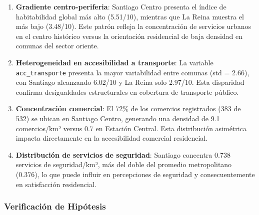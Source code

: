 \begin{enumerate}
    \item \textbf{Gradiente centro-periferia}: Santiago Centro presenta el índice de habitabilidad global más alto (5.51/10), mientras que La Reina muestra el más bajo (3.48/10). Este patrón refleja la concentración de servicios urbanos en el centro histórico versus la orientación residencial de baja densidad en comunas del sector oriente.
    
    \item \textbf{Heterogeneidad en accesibilidad a transporte}: La variable \texttt{acc\_transporte} presenta la mayor variabilidad entre comunas (std = 2.66), con Santiago alcanzando 6.02/10 y La Reina solo 2.97/10. Esta disparidad confirma desigualdades estructurales en cobertura de transporte público.
    
    \item \textbf{Concentración comercial}: El 72\% de los comercios registrados (383 de 532) se ubican en Santiago Centro, generando una densidad de 9.1 comercios/km² versus 0.7 en Estación Central. Esta distribución asimétrica impacta directamente en la accesibilidad comercial residencial.
    
    \item \textbf{Distribución de servicios de seguridad}: Santiago concentra 0.738 servicios de seguridad/km², más del doble del promedio metropolitano (0.376), lo que puede influir en percepciones de seguridad y consecuentemente en satisfacción residencial.
\end{enumerate}

\subsubsection{Verificación de Hipótesis}

